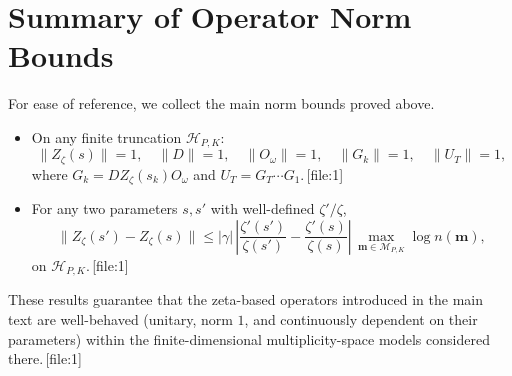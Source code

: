 \documentclass[11pt]{article}
\begin{document}
\section{Summary of Operator Norm Bounds}

For ease of reference, we collect the main norm bounds proved above.

\begin{itemize}[leftmargin=*]
    \item On any finite truncation \(\mathcal{H}_{P,K}\):
    \[
    \| Z_\zeta(s) \| = 1,\quad \|D\| = 1,\quad \|O_\omega\| = 1,\quad \|G_k\| = 1,\quad \|U_T\| = 1,
    \]
    where \(G_k = D Z_\zeta(s_k) O_\omega\) and \(U_T = G_T \cdots G_1\).\,[file:1]
    \item For any two parameters \(s,s'\) with well-defined \(\zeta'/\zeta\),
    \[
    \| Z_\zeta(s') - Z_\zeta(s) \| 
    \leq |\gamma|\,\left| \frac{\zeta'(s')}{\zeta(s')} - \frac{\zeta'(s)}{\zeta(s)} \right| \,\max_{\mathbf{m} \in \mathcal{M}_{P,K}} \log n(\mathbf{m}),
    \]
    on \(\mathcal{H}_{P,K}\).\,[file:1]
\end{itemize}

These results guarantee that the zeta-based operators introduced in the main text are well-behaved (unitary, norm \(1\), and continuously dependent on their parameters) within the finite-dimensional multiplicity-space models considered there.\,[file:1]

\nocite{*}
  
  
\end{document}
